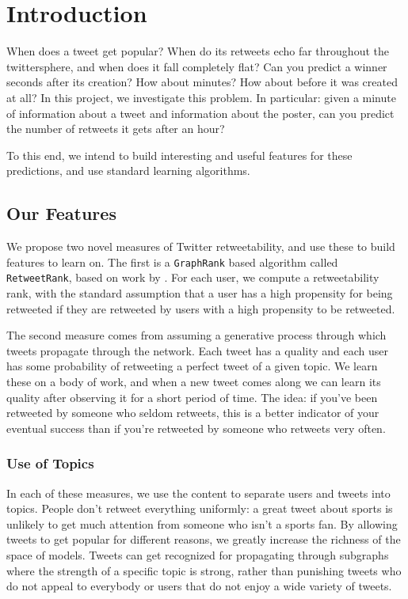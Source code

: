 \section{Introduction}

When does a tweet get popular?  
When do its retweets echo far throughout the twittersphere, and when does  it fall completely flat?
Can you predict a winner seconds after its creation? How about minutes?
How about before it was created at all?
In this project, we investigate this problem.
In particular: given a minute of information about a tweet and information about the poster, can you predict the number of retweets it gets after an hour?

To this end, we intend to build interesting and useful features for these predictions, and use standard learning algorithms.  

\subsection{Our Features}

We propose two novel measures of Twitter retweetability, and use these to build features to learn on.
The first is a \texttt{GraphRank} based algorithm called \texttt{RetweetRank}, based on work by  \cite{Weng:2010:TFT:1718487.1718520}.  
For each user, we compute a retweetability rank, with the standard assumption that a user has a high propensity for being retweeted if they are retweeted by users with a high propensity to be retweeted.  

The second measure comes from assuming a generative process through which tweets propagate through the network.
Each tweet has a quality and each user has some probability of retweeting a perfect tweet of a given topic.
We learn these on a body of work, and when a new tweet comes along we can learn its quality after observing it for a short period of time.  The idea: if you've been retweeted by someone who seldom retweets, this is a better indicator of your eventual success than if you're retweeted by someone who retweets very often.   

\subsubsection{Use of Topics}

In each of these measures, we use the content to separate users and tweets into topics.
People don't retweet everything uniformly: a great tweet about sports is unlikely to get much attention from someone who isn't a sports fan.
By allowing tweets to get popular for different reasons, we greatly increase the richness of the space of models.
Tweets can get recognized for propagating through subgraphs where the strength of a specific topic is strong, rather than punishing tweets who do not appeal to everybody or users that do not enjoy a wide variety of tweets.  


